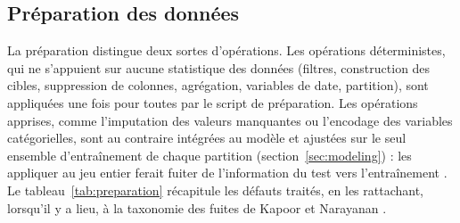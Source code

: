 \documentclass[11pt,a4paper]{article}
\theoremstyle{definition}
\begin{document}
\subsection{Préparation des données}
\label{sec:preparation}

La préparation distingue deux sortes d'opérations. Les opérations déterministes, qui ne s'appuient sur aucune statistique des données (filtres, construction des cibles, suppression de colonnes, agrégation, variables de date, partition), sont appliquées une fois pour toutes par le script de préparation. Les opérations apprises, comme l'imputation des valeurs manquantes ou l'encodage des variables catégorielles, sont au contraire intégrées au modèle et ajustées sur le seul ensemble d'entraînement de chaque partition (section~\ref{sec:modeling}) : les appliquer au jeu entier ferait fuiter de l'information du test vers l'entraînement \cite{kapoor2023leakage}. Le tableau~\ref{tab:preparation} récapitule les défauts traités, en les rattachant, lorsqu'il y a lieu, à la taxonomie des fuites de Kapoor et Narayanan \cite{kapoor2023leakage}.
\end{document}
